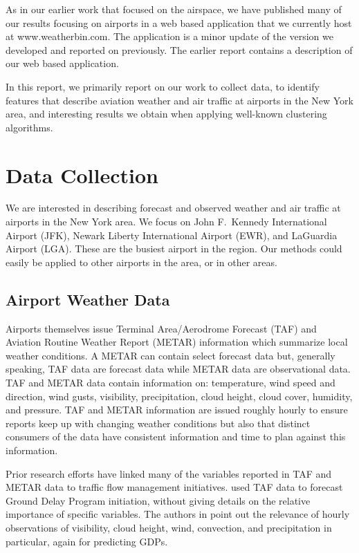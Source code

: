 \documentclass[11pt]{scrartcl}
\begin{document}
As in our earlier work that focused on the airspace, we have published many of our results focusing on airports in a web based application that we currently host at www.weatherbin.com.  The application is a minor update of the version we developed and reported on previously.  The earlier report contains a description of our web based application.

In this report, we primarily report on our work to collect data, to identify features that describe aviation weather and air traffic at airports in the New York area, and interesting results we obtain when applying well-known clustering algorithms.

\section{Data Collection}
We are interested in describing forecast and observed weather and air traffic at airports in the New York area.  We focus on John F.\ Kennedy International Airport (JFK), Newark Liberty International Airport (EWR), and LaGuardia Airport (LGA).  These are the busiest airport in the region.  Our methods could easily be applied to other airports in the area, or in other areas.

\subsection{Airport Weather Data}
Airports themselves issue Terminal Area/Aerodrome Forecast (TAF) and Aviation Routine Weather Report (METAR) information which summarize local weather conditions. A METAR can contain select forecast data but, generally speaking, TAF data are forecast data while METAR data are observational data. TAF and METAR data contain information on: temperature, wind speed and direction, wind gusts, visibility, precipitation, cloud height, cloud cover, humidity, and pressure.  TAF and METAR information are issued roughly hourly to ensure reports keep up with changing weather conditions but also that distinct consumers of the data have consistent information and time to plan against this information.

Prior research efforts have linked many of the variables reported in TAF and METAR data to traffic flow management initiatives. \cite{smith2009decision} used TAF data to forecast Ground Delay Program initiation, without giving details on the relative importance of specific variables.  The authors in \cite{mukherjeepredicting} point out the relevance of hourly observations of visibility, cloud height, wind, convection, and precipitation in particular, again for predicting GDPs.
\end{document}

